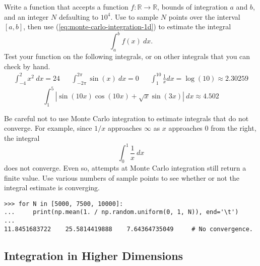 \begin{problem}
Write a function that accepts a function $f:\mathbb{R}\rightarrow\mathbb{R}$, bounds of integration $a$ and $b$, and an integer $N$ defaulting to $10^4$.
Use  to sample $N$ points over the interval $[a,b]$, then use (\ref{eq:monte-carlo-integration-1d}) to estimate the integral
\begin{equation*}
    \int_a^b f(x)\:dx.
\end{equation*}
Test your function on the following integrals, or on other integrals that you can check by hand.
\begin{equation*}
    \begin{array}{ccccc}
    \displaystyle\int_{-4}^2 x^2\:dx = 24
    & &
    \displaystyle\int_{-2\pi}^{2\pi} \sin(x)\:dx = 0
    & &
    \displaystyle\int_1^{10} \frac{1}{x}dx = \log(10) \approx 2.30259
    \end{array}
\end{equation*}
\begin{equation*}
    \int_1^5 \left|\sin(10x)\cos(10x) + \sqrt{x}\sin(3x) \right|\:dx \approx 4.502
\end{equation*}
\label{prob:monte-carlo-integration-1d}
\end{problem}

\begin{warn}
Be careful not to use Monte Carlo integration to estimate integrals that do not converge.
For example, since $1/x$ approaches $\infty$ as $x$ approaches $0$ from the right, the integral \[\int_0^1 \frac{1}{x}\:dx\] does not converge.
Even so, attempts at Monte Carlo integration still return a finite value.
Use various numbers of sample points to see whether or not the integral estimate is converging.
\begin{lstlisting}
>>> for N in [5000, 7500, 10000]:
...     print(np.mean(1. / np.random.uniform(0, 1, N)), end='\t')
...
11.8451683722    25.5814419888    7.64364735049     # No convergence.
\end{lstlisting}
\end{warn}

\subsection*{Integration in Higher Dimensions} %

